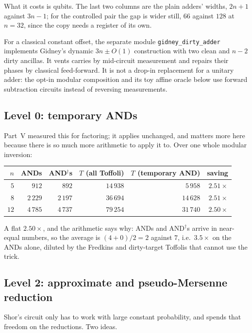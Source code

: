 \documentclass[11pt]{article}
\newcommand{\code}[1]{\texttt{#1}}
\theoremstyle{plain}
\theoremstyle{remark}
\begin{document}
What it costs is qubits. The last two columns are the plain adders' widths, $2n+1$ against
$3n-1$; for the controlled pair the gap is wider still, $66$ against $128$ at
$n=32$, since the copy needs a register of its own.

\noindent
For a classical constant offset, the separate module
\code{gidney\_dirty\_adder} implements Gidney's dynamic $3n\pm O(1)$ construction with two clean
and $n-2$ dirty ancillas. It vents carries by mid-circuit measurement and repairs their phases by
classical feed-forward. It is not a drop-in replacement for a unitary adder:
the opt-in modular composition and its toy affine oracle below use forward
subtraction circuits instead of reversing measurements.

\subsection{Level 0: temporary ANDs}\label{ec:sec:fastand}

Part~V measured this for factoring; it applies unchanged, and matters more here because there is so
much more arithmetic to apply it to. Over one whole modular inversion:

\begin{center}\small
\begin{tabular}{@{}rrrrrr@{}}
\toprule
$n$ & ANDs & AND$^\dagger$s & $T$ (all Toffoli) & $T$ (temporary AND) & saving\\
\midrule
$5$ & $912$ & $892$ & $14\,938$ & $5\,958$ & $2.51\times$\\
$8$ & $2\,229$ & $2\,197$ & $36\,694$ & $14\,628$ & $2.51\times$\\
$12$ & $4\,785$ & $4\,737$ & $79\,254$ & $31\,740$ & $2.50\times$\\
\bottomrule
\end{tabular}
\end{center}

\noindent
A flat $2.50\times$, and the arithmetic says why: ANDs and AND$^\dagger$s arrive in
near-equal numbers, so the average is $(4+0)/2=2$ against $7$, i.e.\ $3.5\times$ on the ANDs alone,
diluted by the Fredkins and dirty-target Toffolis that cannot use the trick.

\subsection{Level 2: approximate and pseudo-Mersenne reduction}\label{ec:sec:approx}

Shor's circuit only has to work with large constant probability, and \cite{ec:schrott26} spends
that freedom on the reductions. Two ideas.
\end{document}
